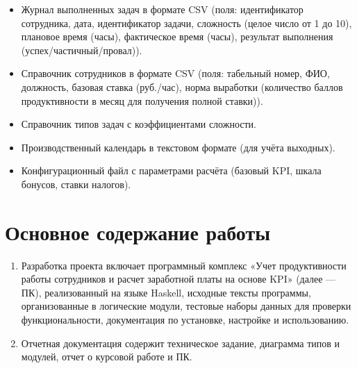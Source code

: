 \documentclass[a4paper, 14pt]{extarticle} %
\begin{document}
\begin{enumerate}[label=\alph*.]
                \begin{itemize}
                    \item Журнал выполненных задач в формате CSV (поля: идентификатор сотрудника, дата, идентификатор задачи, сложность (целое число от 1 до 10), плановое время (часы), фактическое время (часы), результат выполнения (успех/частичный/провал)).
                    \item Справочник сотрудников в формате CSV (поля: табельный номер, ФИО, должность, базовая ставка (руб./час), норма выработки (количество баллов продуктивности в месяц для получения полной ставки)).
                    \item Справочник типов задач с коэффициентами сложности.
                    \item Производственный календарь в текстовом формате (для учёта выходных).
                    \item Конфигурационный файл с параметрами расчёта (базовый KPI, шкала бонусов, ставки налогов).
                \end{itemize}
        \end{enumerate}

    \section{Основное содержание работы}
        \begin{enumerate}[label=\alph*.]
            \item Разработка проекта включает программный комплекс «Учет продуктивности работы сотрудников и расчет заработной платы на основе KPI» (далее — ПК), реализованный на языке Haskell, исходные тексты программы, организованные в логические модули, тестовые наборы данных для проверки функциональности, документация по установке, настройке и использованию.
            \item Отчетная документация содержит техническое задание, диаграмма типов и модулей, отчет о курсовой работе и ПК.
        \end{enumerate}
\end{document}
